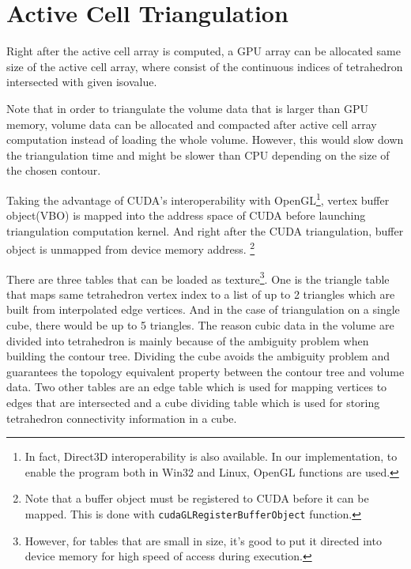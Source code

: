 \documentclass[11pt, b5paper]{report}
\begin{document}

\section{Active Cell Triangulation}

Right after the active cell array is computed, a GPU array can be allocated
same size of the active cell array, where consist of the continuous indices 
of tetrahedron intersected with given isovalue.


Note that in order to triangulate the volume data that is larger than GPU 
memory, volume data can be allocated and compacted after active cell array
computation instead of loading the whole volume. However, this would slow 
down the triangulation time and might be slower than CPU depending on the
size of the chosen contour.

Taking the advantage of CUDA's interoperability with OpenGL\footnote{In 
fact, Direct3D interoperability is also available. In our implementation, 
to enable the program both in Win32 and Linux, OpenGL functions are used.},
vertex buffer object(VBO) is mapped into the address space of CUDA before
launching triangulation computation kernel. And right after the CUDA 
triangulation, buffer object is unmapped from device memory address.
\footnote{Note that a buffer object must be registered to CUDA before it
can be mapped. This is done with \texttt{cudaGLRegisterBufferObject} 
function.}

There are three tables that can be loaded as texture\footnote{However, for 
tables that are small in size, it's good to put it directed into device 
memory for high speed of access during execution.}. One is the triangle 
table that maps same tetrahedron vertex index to a list of up to 2 
triangles which are built from interpolated edge vertices. And in the
case of triangulation on a single cube, there would be up to 5 triangles.
The reason cubic data in the volume are divided into tetrahedron is 
mainly because of the ambiguity problem when building the contour tree.
Dividing the cube avoids the ambiguity problem and guarantees the 
topology equivalent property between the contour tree and volume data.
Two other tables are an edge table which is used for mapping vertices to edges
that are intersected and a cube dividing table which is used for storing
tetrahedron connectivity information in a cube.
\end{document}
